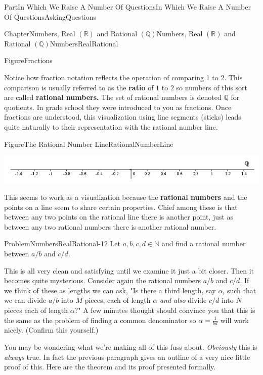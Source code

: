 \documentclass[oneside,10pt,]{book}
\newcommand{\terminology}[1]{\textbf{#1}}
\numberwithin{equation}{part}
\newcommand{\RR}{\mathbb {R}}
\newcommand{\QQ}{\mathbb {Q}}
\newcommand{\NN}{\mathbb {N}}
\begin{document}
\begin{partptx}{Part}{In Which We Raise A Number Of Questions}{}{In Which We Raise A Number Of Questions}{}{}{AskingQuestions}
\begin{chapterptx}{Chapter}{Numbers, Real \(\left(\RR\right)\) and Rational \(\left(\QQ\right)\)}{}{Numbers, Real \(\left(\RR\right)\) and Rational \(\left(\QQ\right)\)}{}{}{NumbersRealRational}
\begin{figureptx}{Figure}{}{Fractions}{}
\begin{image}{0.125}{0.75}{0.125}{}
\end{image}%
\tcblower
\end{figureptx}%
Notice how fraction notation reflects the operation of comparing 1 to 2.  This comparison is usually referred to as the \terminology{ratio} of \(1\) to \(2\) so numbers of this sort are called \terminology{rational numbers.} The set of rational numbers is denoted \(\QQ\) for quotients.  In grade school they were introduced to you as fractions.  Once fractions are understood, this visualization using line segments (sticks) leads quite naturally to their representation with the rational number line.%
\begin{figureptx}{Figure}{The Rational Number Line}{RationalNumberLine}{}%
\begin{image}{0}{1}{0}{}%
\includegraphics[width=\linewidth]{external/images/RationalNumberLine.png}
\end{image}%
\tcblower
\end{figureptx}%
This seems to work as a visualization because the \terminology{rational numbers} and the points on a line seem to share certain properties.  Chief among these is that between any two points on the rational line there is another point, just as between any two rational numbers there is another rational number.%
\begin{problem}{Problem}{}{NumbersRealRational-12}%
Let \(a, b, c, d\in\NN\) and find a rational number between \(a/b\) and \(c/d\).%
\end{problem}
This is all very clean and satisfying until we examine it just a bit closer.  Then it becomes quite mysterious.  Consider again the rational numbers \(a/b\) and \(c/d\).  If we think of these as lengths we can ask, "Is there a third length, say \(\alpha\), such that we can divide \(a/b\) into \(M\) pieces, each of length \(\alpha\) \emph{and also} divide \(c/d\) into \(N\) pieces each of length \(\alpha?\)" A few minutes thought should convince you that this is the same as the problem of finding a common denominator so \(\alpha=\frac{1}{bd}\) will work nicely.  (Confirm this yourself.)%
\par
You may be wondering what we're making all of this fuss about. \emph{Obviously} this is \emph{always} true.  In fact the previous paragraph gives an outline of a very nice little proof of this.  Here are the theorem and its proof presented formally.%

\end{chapterptx}
\end{partptx}
\end{document}
